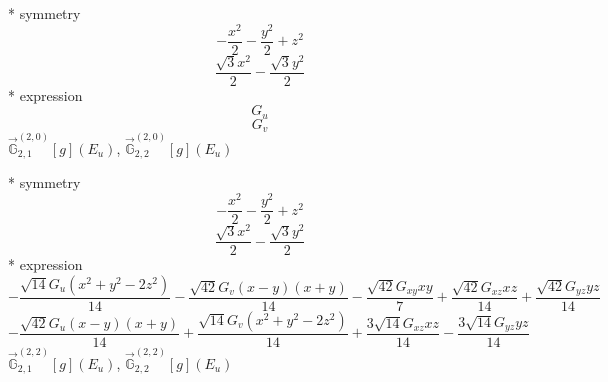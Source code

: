\documentclass[fleqn,8pt]{jsarticle}
\begin{document}
\noindent\quad ** symmetry
\begin{dmath*}
- \frac{x^{2}}{2} - \frac{y^{2}}{2} + z^{2}
\end{dmath*}
\begin{dmath*}
\frac{\sqrt{3} x^{2}}{2} - \frac{\sqrt{3} y^{2}}{2}
\end{dmath*}
\noindent\quad ** expression
\begin{dmath*}
G_{u}
\end{dmath*}
\begin{dmath*}
G_{v}
\end{dmath*}
\noindent\quad $\vec{\mathbb{G}}_{2,1}^{(2,0)}[g](E_{u})$, $\vec{\mathbb{G}}_{2,2}^{(2,0)}[g](E_{u})$

\noindent\quad ** symmetry
\begin{dmath*}
- \frac{x^{2}}{2} - \frac{y^{2}}{2} + z^{2}
\end{dmath*}
\begin{dmath*}
\frac{\sqrt{3} x^{2}}{2} - \frac{\sqrt{3} y^{2}}{2}
\end{dmath*}
\noindent\quad ** expression
\begin{dmath*}
- \frac{\sqrt{14} G_{u} \left(x^{2} + y^{2} - 2 z^{2}\right)}{14} - \frac{\sqrt{42} G_{v} \left(x - y\right) \left(x + y\right)}{14} - \frac{\sqrt{42} G_{xy} x y}{7} + \frac{\sqrt{42} G_{xz} x z}{14} + \frac{\sqrt{42} G_{yz} y z}{14}
\end{dmath*}
\begin{dmath*}
- \frac{\sqrt{42} G_{u} \left(x - y\right) \left(x + y\right)}{14} + \frac{\sqrt{14} G_{v} \left(x^{2} + y^{2} - 2 z^{2}\right)}{14} + \frac{3 \sqrt{14} G_{xz} x z}{14} - \frac{3 \sqrt{14} G_{yz} y z}{14}
\end{dmath*}
\noindent\quad $\vec{\mathbb{G}}_{2,1}^{(2,2)}[g](E_{u})$, $\vec{\mathbb{G}}_{2,2}^{(2,2)}[g](E_{u})$
\end{document}
